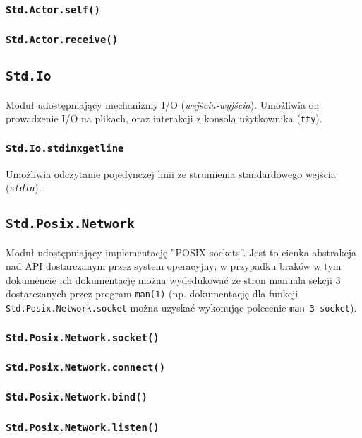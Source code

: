 \documentclass[11pt,oneside,a4paper,titlepage,onecolumn]{article}
\begin{document}
\subsubsection{\texttt{Std.Actor.self()}}
\subsubsection{\texttt{Std.Actor.receive()}}

\subsection{\texttt{Std.Io}}

Moduł udostępniający mechanizmy I/O (\emph{wejścia-wyjścia}). Umożliwia on prowadzenie I/O na plikach, oraz
interakcji z konsolą użytkownika (\texttt{tty}).

\subsubsection{\texttt{Std.Io.stdinxgetline}}

Umożliwia odczytanie pojedynczej linii ze strumienia standardowego wejścia (\emph{\texttt{stdin}}).

\subsection{\texttt{Std.Posix.Network}}

Moduł udostępniający implementację ''POSIX sockets''. Jest to cienka abstrakcja nad API dostarczanym przez
system operacyjny; w przypadku braków w tym dokumencie ich dokumentację można wydedukować ze stron manuala
sekcji 3 dostarczanych przez program \texttt{man(1)} (np. dokumentację dla funkcji
\texttt{Std.Posix.Network.socket} można uzyskać wykonując polecenie \texttt{man 3 socket}).

\subsubsection{\texttt{Std.Posix.Network.socket()}}
\subsubsection{\texttt{Std.Posix.Network.connect()}}
\subsubsection{\texttt{Std.Posix.Network.bind()}}
\subsubsection{\texttt{Std.Posix.Network.listen()}}
\end{document}
